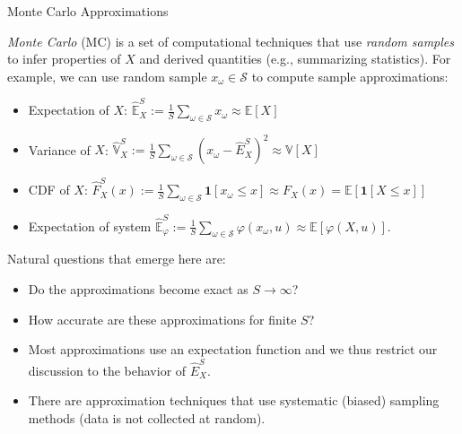 \documentclass[9pt]{beamer}
\begin{document}
%
\begin{frame}{Monte Carlo Approximations}

{\em Monte Carlo} (MC) is a set of computational techniques that use {\em random samples} to infer properties of $X$ and derived quantities (e.g., summarizing statistics).  For example, we can use random sample $x_\omega \in \mathcal{S}$ to compute sample approximations:
\begin{block}{}
\begin{itemize}
\item Expectation of $X$: $\hat{\mathbb{E}}_X^S:=\frac{1}{S}\sum_{\omega \in \mathcal{S}}x_\omega\approx \mathbb{E}[X]$
\item Variance of $X$: $\hat{\mathbb{V}}_X^S:=\frac{1}{S}\sum_{\omega \in \mathcal{S}}(x_\omega-\hat{E}_X^S)^2\approx \mathbb{V}[X]$
\item CDF of $X$: $\hat{F}_X^S(x):=\frac{1}{S}\sum_{\omega 
\in \mathcal{S}}\mathbf{1}[x_\omega \leq x]\approx F_X(x)=\mathbb{E}[{\mathbf{1}[X \leq x]}]$
\item Expectation of system $\hat{\mathbb{E}}_\varphi^S:=\frac{1}{S}\sum_{\omega 
\in \mathcal{S}}\varphi(x_\omega,u)\approx \mathbb{E}[{\varphi(X,u)}]$. 
\end{itemize}
\end{block}
Natural questions that emerge here are: 
\begin{block}{}
\begin{itemize}
\item Do the approximations become exact as $S\to \infty$?
\item How accurate are these approximations for finite $S$?
\end{itemize}
\end{block}
\begin{itemize}
\item Most approximations use an expectation function and we thus restrict our discussion to the behavior of $\hat{E}_X^S$. 
\item There are approximation techniques that use systematic (biased) sampling methods (data is not collected at random). 
\end{itemize}
\end{frame}
\end{document}
